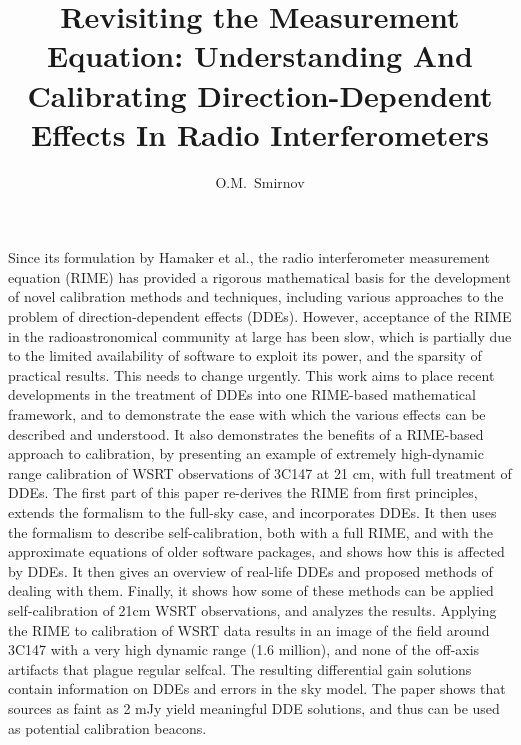 \documentclass[]{aa}
\begin{document}
\title{Revisiting the Measurement Equation: Understanding And Calibrating Direction-Dependent Effects  In Radio Interferometers}

\author{O.M.\ Smirnov}


\date{}


\abstract%
{Since its formulation by Hamaker et al., the radio interferometer measurement equation (RIME) 
has provided a rigorous mathematical basis for the development of novel calibration methods and 
techniques, including various approaches to the problem of direction-dependent effects (DDEs). 
However, acceptance of the RIME in the radioastronomical community at large has been slow, which is
partially due to the limited availability of software to exploit its power, and the sparsity of 
practical results. This needs to change urgently.}
{This work aims to place recent developments in the treatment of DDEs into one RIME-based mathematical 
framework, and to demonstrate the ease with which the various effects can be described and understood. 
It also demonstrates the benefits of a RIME-based approach to calibration, by presenting 
an example of extremely high-dynamic range calibration of WSRT observations of 3C147 at 21 cm, with 
full treatment of DDEs. 
}
{The first part of this paper re-derives the RIME from first principles, extends the formalism to
the full-sky case, and incorporates DDEs. It then uses the formalism to describe self-calibration, both with 
a full RIME, and with the approximate equations of older software packages, and shows how this is affected 
by DDEs. It then gives an overview of real-life DDEs and proposed methods of dealing with them. Finally, it 
shows how some of these methods can be applied self-calibration of 21cm WSRT observations, and analyzes the results.
}%
{Applying the RIME to calibration of WSRT data results in an image of the field around 3C147 with a very high dynamic 
range (1.6 million), and none of the off-axis artifacts that plague regular selfcal. The resulting differential gain solutions contain information on DDEs and errors in the sky model. The paper shows that sources as faint as 2 mJy 
yield meaningful DDE solutions, and thus can be used as potential calibration beacons. 
}%
{}
\end{document}
